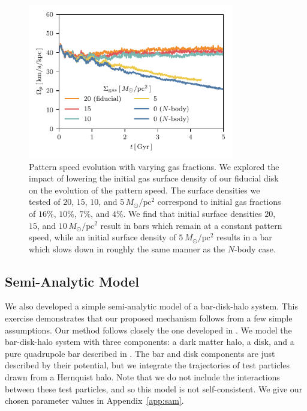\documentclass[twocolumn,linenumbers,trackchanges]{aastex631}
\newcommand{\Nbody}{$N$-body}
\newcommand{\Msun}{\ensuremath{M_{\odot}}}
\begin{document}
\begin{figure}
    \centering
    \includegraphics[width=9cm]{fig/ps_fgas.pdf}
    \caption{Pattern speed evolution with varying gas fractions. We explored the
    impact of lowering the initial gas surface density of our fiducial disk on
    the evolution of the pattern speed. The surface densities we tested of $20$,
    $15$, $10$, and $5\,\Msun/\textrm{pc}^2$ correspond to initial gas
    fractions of $16\%$, $10\%$, $7\%$, and $4\%$. We find that initial surface
    densities $20$, $15$, and $10\,\Msun/\textrm{pc}^2$ result in bars which
    remain at a constant pattern speed, while an initial surface density of
    $5\,\Msun/\textrm{pc}^2$ results in a bar which slows down in roughly the
    same manner as the \Nbody{} case.}
    \label{fig:fgas}
\end{figure}

\subsection{Semi-Analytic Model}
We also developed a simple semi-analytic model of a bar-disk-halo system. This
exercise demonstrates that our proposed mechanism follows from a few simple
assumptions. Our method follows closely the one developed in
\citet{2022MNRAS.513..768C}. We model the bar-disk-halo system with three
components: a dark matter \citet{1990ApJ...356..359H} halo, a
\citet{1975PASJ...27..533M} disk, and a pure quadrupole bar
described in \citet{2022MNRAS.513..768C}. The bar and disk components are just
described by their potential, but we integrate the trajectories of test
particles drawn from a Hernquist halo. Note that we do not include the
interactions between these test particles, and so this model is not
self-consistent. We give our chosen parameter values in Appendix~\ref{app:sam}.
\end{document}

